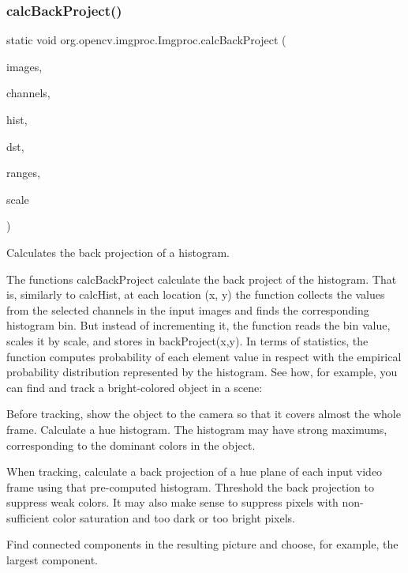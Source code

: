 \subsubsection{\texorpdfstring{calc\+Back\+Project()}{calcBackProject()}}
{\footnotesize\ttfamily static void org.\+opencv.\+imgproc.\+Imgproc.\+calc\+Back\+Project (\begin{DoxyParamCaption}\item[{List$<$ \mbox{\hyperlink{classorg_1_1opencv_1_1core_1_1_mat}{Mat}} $>$}]{images,  }\item[{\mbox{\hyperlink{classorg_1_1opencv_1_1core_1_1_mat_of_int}{Mat\+Of\+Int}}}]{channels,  }\item[{\mbox{\hyperlink{classorg_1_1opencv_1_1core_1_1_mat}{Mat}}}]{hist,  }\item[{\mbox{\hyperlink{classorg_1_1opencv_1_1core_1_1_mat}{Mat}}}]{dst,  }\item[{\mbox{\hyperlink{classorg_1_1opencv_1_1core_1_1_mat_of_float}{Mat\+Of\+Float}}}]{ranges,  }\item[{double}]{scale }\end{DoxyParamCaption})\hspace{0.3cm}{\ttfamily [static]}}

Calculates the back projection of a histogram.

The functions {\ttfamily calc\+Back\+Project} calculate the back project of the histogram. That is, similarly to {\ttfamily calc\+Hist}, at each location {\ttfamily (x, y)} the function collects the values from the selected channels in the input images and finds the corresponding histogram bin. But instead of incrementing it, the function reads the bin value, scales it by {\ttfamily scale}, and stores in {\ttfamily back\+Project(x,y)}. In terms of statistics, the function computes probability of each element value in respect with the empirical probability distribution represented by the histogram. See how, for example, you can find and track a bright-\/colored object in a scene\+:


\begin{DoxyItemize}
\item Before tracking, show the object to the camera so that it covers almost the whole frame. Calculate a hue histogram. The histogram may have strong maximums, corresponding to the dominant colors in the object. 
\item When tracking, calculate a back projection of a hue plane of each input video frame using that pre-\/computed histogram. Threshold the back projection to suppress weak colors. It may also make sense to suppress pixels with non-\/sufficient color saturation and too dark or too bright pixels. 
\item Find connected components in the resulting picture and choose, for example, the largest component. 
\end{DoxyItemize}

